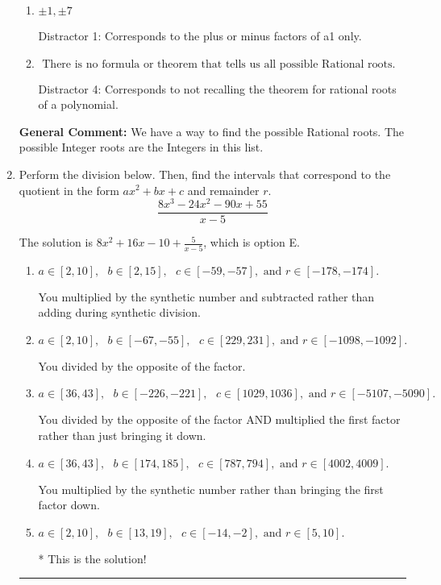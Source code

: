 \documentclass{extbook}[14pt]
\newcommand{\litem}[1]{\item #1

\rule{\textwidth}{0.4pt}}
\begin{document}
\begin{enumerate}
{\begin{enumerate}[label=\Alph*.]
* This is the solution \textbf{since we asked for the possible Rational roots}!
\item \( \pm 1,\pm 7 \)

 Distractor 1: Corresponds to the plus or minus factors of a1 only.
\item \( \text{ There is no formula or theorem that tells us all possible Rational roots.} \)

 Distractor 4: Corresponds to not recalling the theorem for rational roots of a polynomial.
\end{enumerate}

\textbf{General Comment:} We have a way to find the possible Rational roots. The possible Integer roots are the Integers in this list.
}
\litem{
Perform the division below. Then, find the intervals that correspond to the quotient in the form $ax^2+bx+c$ and remainder $r$.
\[ \frac{8x^{3} -24 x^{2} -90 x + 55}{x -5} \]

The solution is \( 8x^{2} +16 x -10 + \frac{5}{x -5} \), which is option E.\begin{enumerate}[label=\Alph*.]
\item \( a \in [2, 10], \text{   } b \in [2, 15], \text{   } c \in [-59, -57], \text{   and   } r \in [-178, -174]. \)

 You multiplied by the synthetic number and subtracted rather than adding during synthetic division.
\item \( a \in [2, 10], \text{   } b \in [-67, -55], \text{   } c \in [229, 231], \text{   and   } r \in [-1098, -1092]. \)

 You divided by the opposite of the factor.
\item \( a \in [36, 43], \text{   } b \in [-226, -221], \text{   } c \in [1029, 1036], \text{   and   } r \in [-5107, -5090]. \)

 You divided by the opposite of the factor AND multiplied the first factor rather than just bringing it down.
\item \( a \in [36, 43], \text{   } b \in [174, 185], \text{   } c \in [787, 794], \text{   and   } r \in [4002, 4009]. \)

 You multiplied by the synthetic number rather than bringing the first factor down.
\item \( a \in [2, 10], \text{   } b \in [13, 19], \text{   } c \in [-14, -2], \text{   and   } r \in [5, 10]. \)

* This is the solution!
\end{enumerate}

}
\end{enumerate}
\end{document}
